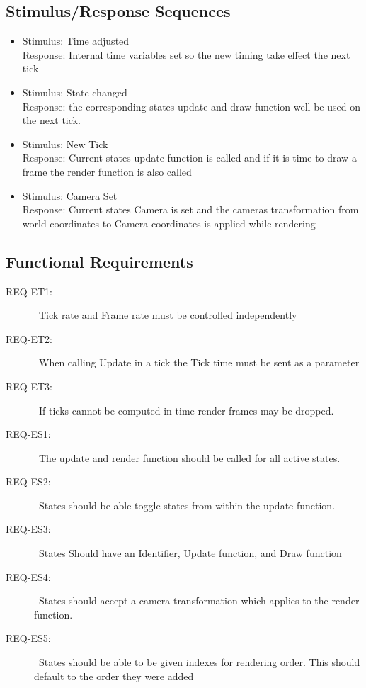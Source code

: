 \documentclass{scrreprt}
\begin{document}
\subsection{Stimulus/Response Sequences}
\begin{itemize}
\item Stimulus:		Time adjusted\\
	Response: 		Internal time variables set so the new timing take effect the next tick\\
	
\item Stimulus:		State changed\\
	Response: 		the corresponding states update and draw function well be used on the next tick.\\
	
\item Stimulus:		New Tick\\
	Response: 		Current states update function is called and if it is time to draw a frame the render function is also called \\
	
\item Stimulus:		Camera Set\\
	Response: 		Current states Camera is set and the cameras transformation from world coordinates to Camera coordinates is applied while rendering \\

\end{itemize}


	

\subsection{Functional Requirements}

\begin{description}
\item [{REQ-ET1:}]~Tick rate and Frame rate must be controlled independently
\item [{REQ-ET2:}]~When calling Update in a tick the Tick time must be sent as a parameter
\item [{REQ-ET3:}]~If ticks cannot be computed in time render frames may be dropped.
\item [{REQ-ES1:}]~The update and render function should be called for all active states.
\item [{REQ-ES2:}]~States should be able toggle states from within the update function.
\item [{REQ-ES3:}]~States Should have an Identifier, Update function, and Draw function
\item [{REQ-ES4:}]~States should accept a camera transformation which applies to the render function.
\item [{REQ-ES5:}]~States should be able to be given indexes for rendering order.  This should default to the order they were added

\end{description}
\end{document}
